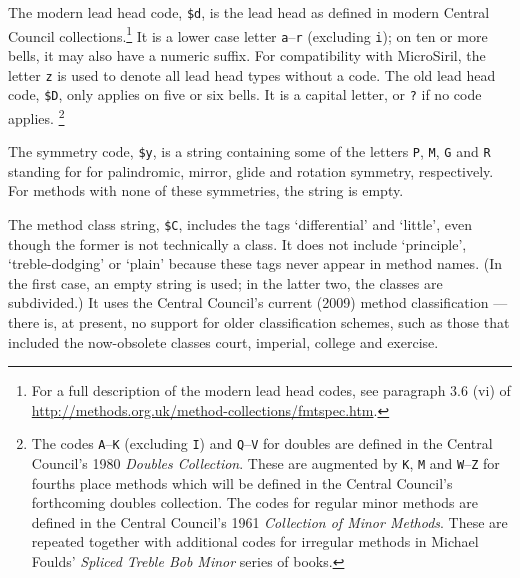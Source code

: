 \documentclass[a4paper,11pt,oneside]{book}
\makeatletter
\newcommand{\fspec}[1]{\index{#1@{\hspace*{-\fspecwidth}\texttt{\$#1}}}}
\makeatother
\begin{document}
The modern lead head code, \verb+$d+\fspec{d}, is the lead head as defined
in modern Central Council collections.\footnote{For a full description
of the modern lead head codes, see paragraph 3.6 (vi) of 
\url{http://methods.org.uk/method-collections/fmtspec.htm}.}
It is a lower case letter \verb+a+--\verb+r+ (excluding \verb+i+); 
on ten or more bells, it may also have a numeric suffix.  For compatibility
with MicroSiril, the letter \verb+z+ is used
to denote all lead head types without a code.  The old lead head code,
\verb+$D+\fspec{D}, only applies on five or six bells.  It is a capital
letter, or \verb+?+ if no code applies.%
\footnote{The codes \verb+A+--\verb+K+ (excluding \verb+I+) 
and \verb+Q+--\verb+V+ for doubles are defined in the Central Council's
1980 \textit{Doubles Collection}.%
These are augmented by \verb+K+, \verb+M+ and \verb+W+--\verb+Z+ for
fourths place methods which will be defined in the Central Council's 
forthcoming doubles collection.
The codes for regular minor methods are defined in the Central Council's
1961 \textit{Collection of Minor Methods}.  These are
repeated together with additional codes for irregular methods in Michael
Foulds' \textit{Spliced Treble Bob Minor} series of books.%
}

The symmetry code, \verb+$y+\fspec{y}, is a string containing some of 
the letters \verb+P+, \verb+M+, \verb+G+ and \verb+R+ standing for
for palindromic, mirror, glide and rotation symmetry, respectively.  For
methods with none of these symmetries, the string is empty.

The method class string, \verb+$C+\fspec{C}, includes the tags `differential'
and `little', even though the former is not technically a class.  It does
not include `principle', `treble-dodging' or `plain' because these tags never
appear in method names.  (In the first case, an empty string is used; in 
the latter two, the classes are subdivided.)   It uses
the Central Council's current (2009) method classification%
 --- there is, at present, no support for 
older classification schemes, such as those that included the now-obsolete 
classes court, imperial, 
college and exercise.  
\end{document}
